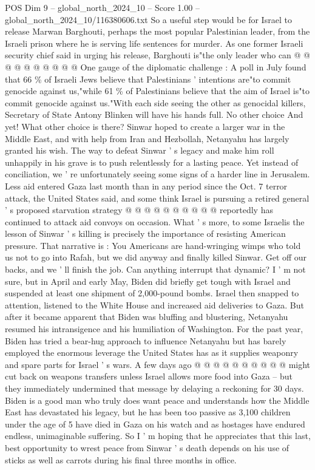 \begin{textsample}{POS Dim 9 – global\_north\_2024\_10 – Score 1.00 – global\_north\_2024\_10/116380606.txt}
So a useful step would be for Israel to release Marwan Barghouti, perhaps the most popular Palestinian leader, from the Israeli prison where he is serving life sentences for murder.
As one former Israeli security chief said in urging his release, Barghouti is"the only leader who can @ @ @ @ @ @ @ @ @ @ One gauge of the diplomatic challenge : A poll in July found that 66 \% of Israeli Jews believe that Palestinians ' intentions are"to commit genocide against us,"while 61 \% of Palestinians believe that the aim of Israel is"to commit genocide against us."With each side seeing the other as genocidal killers, Secretary of State Antony Blinken will have his hands full.
No other choice And yet!
What other choice is there?
Sinwar hoped to create a larger war in the Middle East, and with help from Iran and Hezbollah, Netanyahu has largely granted his wish.
The way to defeat Sinwar ' s legacy and make him roll unhappily in his grave is to push relentlessly for a lasting peace.
Yet instead of conciliation, we ' re unfortunately seeing some signs of a harder line in Jerusalem.
Less aid entered Gaza last month than in any period since the Oct. 7 terror attack, the United States said, and some think Israel is pursuing a retired general ' s proposed starvation strategy @ @ @ @ @ @ @ @ @ @ reportedly has continued to attack aid convoys on occasion.
What ' s more, to some Israelis the lesson of Sinwar ' s killing is precisely the importance of resisting American pressure.
That narrative is : You Americans are hand-wringing wimps who told us not to go into Rafah, but we did anyway and finally killed Sinwar.
Get off our backs, and we ' ll finish the job.
Can anything interrupt that dynamic?
I ' m not sure, but in April and early May, Biden did briefly get tough with Israel and suspended at least one shipment of 2,000-pound bombs.
Israel then snapped to attention, listened to the White House and increased aid deliveries to Gaza.
But after it became apparent that Biden was bluffing and blustering, Netanyahu resumed his intransigence and his humiliation of Washington.
For the past year, Biden has tried a bear-hug approach to influence Netanyahu but has barely employed the enormous leverage the United States has as it supplies weaponry and spare parts for Israel ' s wars.
A few days ago @ @ @ @ @ @ @ @ @ @ might cut back on weapons transfers unless Israel allows more food into Gaza -- but they immediately undermined that message by delaying a reckoning for 30 days.
Biden is a good man who truly does want peace and understands how the Middle East has devastated his legacy, but he has been too passive as 3,100 children under the age of 5 have died in Gaza on his watch and as hostages have endured endless, unimaginable suffering.
So I ' m hoping that he appreciates that this last, best opportunity to wrest peace from Sinwar ' s death depends on his use of sticks as well as carrots during his final three months in office.

\end{textsample}
